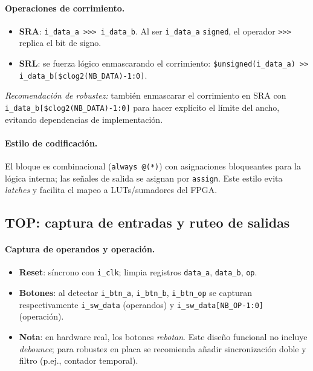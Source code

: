 \paragraph{Operaciones de corrimiento.}
\begin{itemize}
    \item \textbf{SRA}: \verb|i_data_a >>> i_data_b|. 
    Al ser \verb|i_data_a| \texttt{signed}, el operador \verb|>>>| replica el bit de signo. 

    \item \textbf{SRL}: se fuerza lógico enmascarando el corrimiento:
    \lstinline|$unsigned(i_data_a) >> i_data_b[$clog2(NB_DATA)-1:0]|.
\end{itemize}

\begin{sloppypar}
\textit{Recomendación de robustez:} también enmascarar el corrimiento en SRA con \texttt{i\_data\_b[\$clog2(NB\_DATA)-1:0]} para hacer explícito el límite del ancho, evitando dependencias de implementación.
\end{sloppypar}

\paragraph{Estilo de codificación.}
El bloque es combinacional (\texttt{always @(*)}) con asignaciones bloqueantes para la lógica interna; las señales de salida se asignan por \texttt{assign}. Este estilo evita \textit{latches} y facilita el mapeo a LUTs/sumadores del FPGA.

\subsection{TOP: captura de entradas y ruteo de salidas}
\paragraph{Captura de operandos y operación.}
\begin{itemize}
    \item \textbf{Reset}: síncrono con \texttt{i\_clk}; limpia registros \texttt{data\_a}, \texttt{data\_b}, \texttt{op}.
    \item \textbf{Botones}: al detectar \texttt{i\_btn\_a}, \texttt{i\_btn\_b}, \texttt{i\_btn\_op} se capturan respectivamente \texttt{i\_sw\_data} (operandos) y \texttt{i\_sw\_data[NB\_OP-1:0]} (operación).
    \item \textbf{Nota}: en hardware real, los botones \textit{rebotan}. Este diseño funcional no incluye \textit{debounce}; para robustez en placa se recomienda añadir sincronización doble y filtro (p.ej., contador temporal).
\end{itemize}

